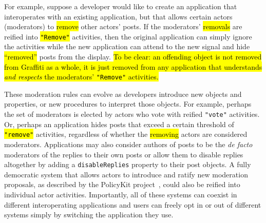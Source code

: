 
For example, suppose a developer would like to create an application
that interoperates with an existing application,
but that allows certain actors (moderators) to \hl{remove} other actors' posts.
If the moderators' \hl{removals} are reified into \hl{\texttt{"Remove"}} activities,
then the original application can simply ignore the activities
while the new application can attend to the new signal and hide \hl{``removed''} posts from the display.
\hl{%
To be clear: an offending object is not removed from Graffiti as a whole,
it is just removed from any application that understands \emph{and respects}
the moderators' \texttt{"Remove"} activities.
}%

These moderation rules can evolve as developers
introduce new objects and properties,
or new procedures to interpret those objects.
For example,
perhaps the set of moderators is elected by actors who vote with reified \texttt{"vote"} activities.
Or, perhaps an application hides posts that exceed a certain threshold of \hl{\texttt{"remove"}} activities,
regardless of whether the \hl{removing} actors are considered moderators.
Applications may also consider authors of posts to be the \emph{de facto} moderators of the replies to their
own posts or allow them to disable replies altogether by adding a \texttt{disableReplies}
property to their post objects.
A fully democratic system that allows actors to introduce and ratify new moderation proposals,
as described by the PolicyKit project~\cite{policykit}, could also be reified into
individual actor activities.
Importantly, all of these systems can coexist in different interoperating
applications and users can freely opt in or out of different systems simply by switching
the application they use.




